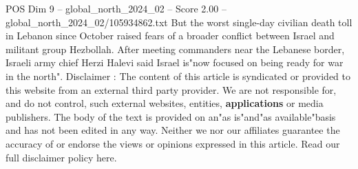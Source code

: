 \begin{textsample}{POS Dim 9 – global\_north\_2024\_02 – Score 2.00 – global\_north\_2024\_02/105934862.txt}
But the worst single-day civilian death toll in Lebanon since October raised fears of a broader conflict between Israel and militant group Hezbollah.
After meeting commanders near the Lebanese border, Israeli army chief Herzi Halevi said Israel is"now focused on being ready for war in the north".
Disclaimer : The content of this article is syndicated or provided to this website from an external third party provider.
We are not responsible for, and do not control, such external websites, entities, \textbf{applications} or media publishers.
The body of the text is provided on an"as is"and"as available"basis and has not been edited in any way.
Neither we nor our affiliates guarantee the accuracy of or endorse the views or opinions expressed in this article.
Read our full disclaimer policy here.

\end{textsample}
